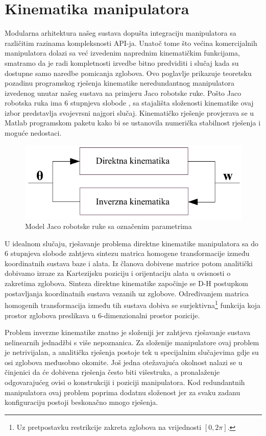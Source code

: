 \documentclass[times, utf8, diplomski, numeric]{fer}
\begin{document}
\chapter{Kinematika manipulatora}
Modularna arhitektura našeg sustava dopušta integraciju manipulatora sa različitim razinama kompleksnosti API-ja.
Unatoč tome što većina komercijalnih manipulatora dolazi sa već izvedenim naprednim kinematičkim funkcijama, smatramo da je radi kompletnosti izvedbe bitno predviditi i slučaj kada su dostupne samo naredbe pomicanja zglobova.
Ovo poglavlje prikazuje teoretsku pozadinu programskog rješenja kinematike neredundantnog manipulatora izvedenog unutar našeg sustava na primjeru Jaco robotske ruke.
Pošto Jaco robotska ruka ima 6 stupnjeva slobode , sa stajališta složenosti kinematike ovaj izbor predstavlja svojevrsni najgori slučaj.
Kinematičko rješenje provjerava se u Matlab programskom paketu kako bi se ustanovila numerička stabilnost rješenja i moguće nedostaci.

\begin{figure}[h!]
\centering
\includegraphics[scale=0.8]{kinematika}
\caption{Model Jaco robotske ruke sa označenim parametrima} \label{h}
\end{figure}

U idealnom slučaju, rješavanje problema direktne kinematike manipulatora sa do 6 stupnjeva slobode zahtjeva sintezu matrica homogene transformacije između koordinatnih sustava baze i alata.
Iz članova dobivene matrice potom analitički dobivamo izraze za Kartezijsku poziciju i orijentaciju alata u ovisnosti o zakretima zglobova.
Sinteza direktne kinematike započinje se D-H postupkom \cite{uicker1964iterative} postavljanja koordinatnih sustava vezanih uz zglobove.
Određivanjem matrica homogenih transformacija između tih sustava dobiva se surjektivna\footnote{Uz pretpostavku restrikcije zakreta zglobova na vrijednosti $[0,2\pi]$.} funkcija koja prostor zglobova preslikava u 6-dimenzionalni prostor pozicije.

Problem inverzne kinematike znatno je složeniji jer zahtjeva rješavanje sustava nelinearnih jednadžbi s više nepoznanica.
Za složenije manipulatore  ovaj problem je netrivijalan, a analitička rješenja postoje tek u specijalnim slučajevima gdje su osi zglobova međusobno okomite.
Još jedna otežavajuća okolnost nalazi se u činjenici da će dobivena rješenja često biti višestruka, a pronalaženje odgovarajućeg ovisi o konstrukciji i poziciji manipulatora.
Kod redundantnih manipulatora ovaj problem poprima dodatnu složenost jer za svaku zadanu konfiguraciju postoji beskonačno mnogo rješenja.
\end{document}
